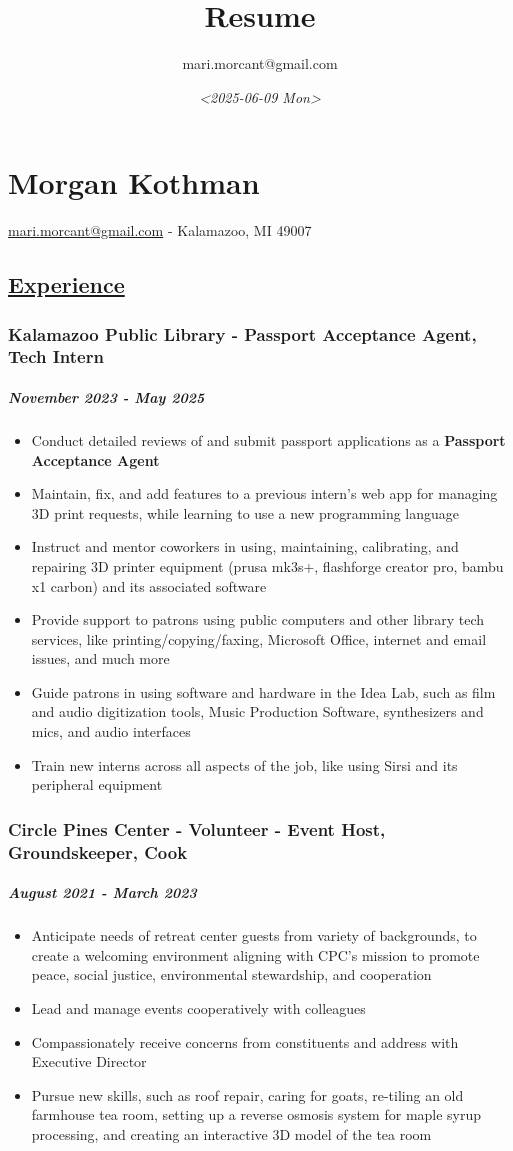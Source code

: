 \documentclass[11pt]{article}
\author{mari.morcant@gmail.com}
\date{\textit{<2025-06-09 Mon>}}
\title{Resume}
\begin{document}
\section*{Morgan Kothman}
\label{sec:org3008661}
\href{mailto:mari.morcant@gmail.com}{mari.morcant@gmail.com} - Kalamazoo, MI 49007
\subsection*{\underline{Experience}}
\label{sec:org3ea5c3e}
\subsubsection*{Kalamazoo Public Library - Passport Acceptance Agent, Tech Intern}
\label{sec:org540f86c}
\subparagraph*{November 2023 - May 2025}
\label{sec:orgbe7f0bb}
\begin{itemize}
\item Conduct detailed reviews of and submit passport applications as a \textbf{Passport Acceptance Agent}
\item Maintain, fix, and add features to a previous intern's web app for managing 3D print requests, while learning to use a new programming language
\item Instruct and mentor coworkers in using, maintaining, calibrating, and repairing 3D printer equipment (prusa mk3s+, flashforge creator pro, bambu x1 carbon) and its associated software
\item Provide support to patrons using public computers and other library tech services, like printing/copying/faxing, Microsoft Office, internet and email issues, and much more
\item Guide patrons in using software and hardware in the Idea Lab, such as film and audio digitization tools, Music Production Software, synthesizers and mics, and audio interfaces
\item Train new interns across all aspects of the job, like using Sirsi and its peripheral equipment
\end{itemize}
\subsubsection*{Circle Pines Center - Volunteer - Event Host, Groundskeeper, Cook}
\label{sec:orgae2bc94}
\subparagraph*{\emph{August 2021 - March 2023}}
\label{sec:org1a43824}
\begin{itemize}
\item Anticipate needs of retreat center guests from variety of backgrounds, to create a welcoming environment aligning with CPC’s mission to promote peace, social justice, environmental stewardship, and cooperation
\item Lead and manage events cooperatively with colleagues
\item Compassionately receive concerns from constituents and address with Executive Director
\item Pursue new skills, such as roof repair, caring for goats, re-tiling an old farmhouse tea room, setting up a reverse osmosis system for maple syrup processing, and creating an interactive 3D model of the tea room
\end{itemize}
\end{document}
